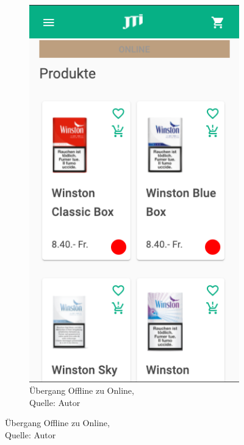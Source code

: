 \begin{figure}[H]
\begin{subfigure}[b]{0.5\textwidth}
		\includegraphics[scale=0.5]{images/backOnline.PNG}
		\caption[Übergang Offline zu Online]{Übergang Offline zu Online,\\ Quelle: Autor}
		\label{img: offlineOnline}
	\end{subfigure}
\end{figure} 
